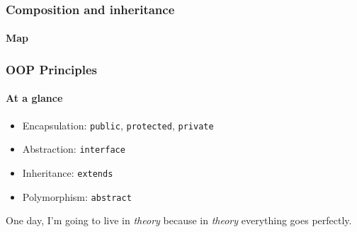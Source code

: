 \begin{frame}[fragile,c]
    \frametitle{Composition and inheritance}
    \framesubtitle{Map}

\end{frame}

\begin{frame}
    \frametitle{OOP Principles}
    \framesubtitle{At a glance}

    \begin{itemize}
        \item Encapsulation\pause: \texttt{public}, \texttt{protected}, \texttt{private}
        \pause
        \item Abstraction\pause: \texttt{interface}
        \pause
        \item Inheritance\pause: \texttt{extends}
        \pause
        \item Polymorphism\pause: \texttt{abstract}
    \end{itemize}
\end{frame}

\begin{frame}[c]
    \begin{center}
        \Huge One day, I’m going to live in \textit{theory} \pause because in \textit{theory} everything goes perfectly.
    \end{center}
\end{frame}

